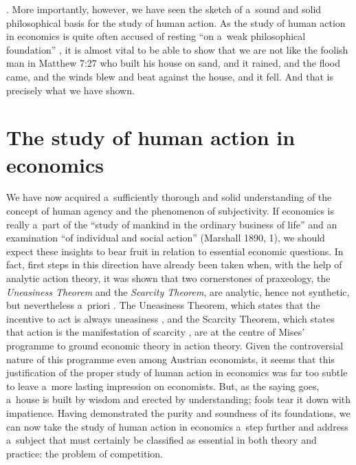 \parencites[cf.][]{condic_hayek_2021}[][p.94]{rajagopalan_austrian_2019}[][]{knudsen_alfred_2004}[][]{yeager_mises_1994}[][p.63f.]{herbener_economic_1993}[][p.23ff.]{boettke_political_1990}[][p.50]{lavoie_rivalry_2015}[][]{hayek_use_1945}[][p.33]{hayek_economics_1948}[][]{}. %
 More importantly, however, we have seen the sketch of a~sound and solid philosophical basis for the study of human action. As the study of human action in economics is quite often accused of resting ``on a~weak philosophical foundation'' 
\parencite[cf.][p.65]{barrotta_neo-kantian_1996}, %
 it is almost vital to be able to show that we are not like the foolish man in Matthew 7:27 who built his house on sand, and it rained, and the flood came, and the winds blew and beat against the house, and it fell. And that is precisely what we have shown.



\section{The study of human action in economics}

We have now acquired a~sufficiently thorough and solid understanding of the concept of human agency and the phenomenon of subjectivity. If economics is really a~part of the ``study of mankind in the ordinary business of life'' and an examination ``of individual and social action'' (Marshall 1890, 1), we should expect these insights to bear fruit in relation to essential economic questions. In fact, first steps in this direction have already been taken when, with the help of analytic action theory, it was shown that two cornerstones of praxeology, the \textit{Uneasiness Theorem} and the \textit{Scarcity Theorem}, are analytic, hence not synthetic, but nevertheless a~priori 
\parencite[][]{oliva_cordoba_uneasiness_2017}. %
 The Uneasiness Theorem, which states that the incentive to act is always uneasiness 
\parencite[][p.13]{mises_human_1998}, %
 and the Scarcity Theorem, which states that action is the manifestation of scarcity 
\parencite[][p.70]{mises_human_1998}, %
 are at the centre of Mises' programme to ground economic theory in action theory. Given the controversial nature of this programme even among Austrian economists, it seems that this justification of the proper study of human action in economics was far too subtle to leave a~more lasting impression on economists. But, as the saying goes, a~house is built by wisdom and erected by understanding; fools tear it down with impatience. Having demonstrated the purity and soundness of its foundations, we can now take the study of human action in economics a~step further and address a~subject that must certainly be classified as essential in both theory and practice: the problem of competition.



